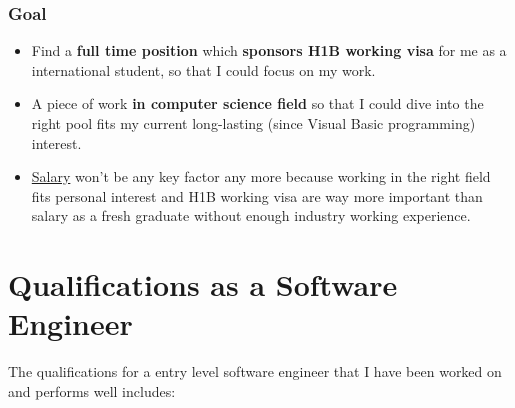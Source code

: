 \documentclass[9pt,b5paper]{article}
\begin{document}
\subsubsection{Goal}
\label{sec-9-3-3}
\begin{itemize}
\item Find a \textbf{full time position} which \textbf{sponsors H1B working visa} for me as a international student, so that I could focus on my work.
\item A piece of work \textbf{in computer science field} so that I could dive into the right pool fits my current long-lasting (since Visual Basic programming) interest.
\item \uline{Salary} won't be any key factor any more because working in the right field fits personal interest and H1B working visa are way more important than salary as a fresh graduate without enough industry working experience.
\end{itemize}

\section{Qualifications as a Software Engineer}
\label{sec-10}
The qualifications for a entry level software engineer that I have been worked on and performs well includes: 
\end{document}
